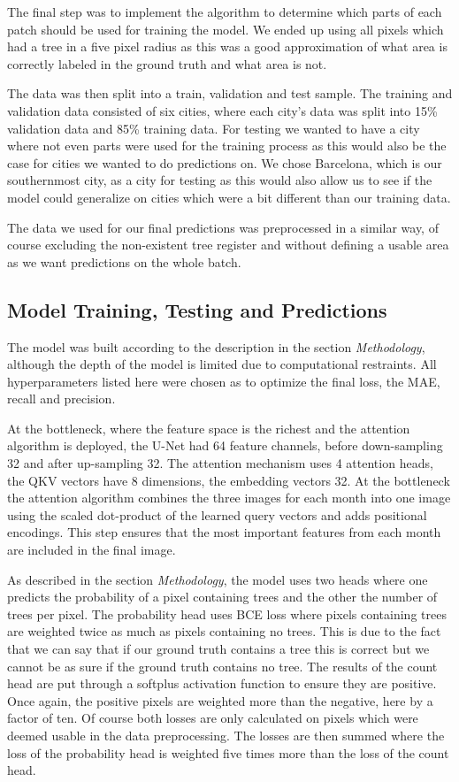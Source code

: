The final step was to implement the algorithm to determine which parts of each patch should be used for training the model. We ended up using all pixels which had a tree in a five pixel radius as this was a good approximation of what area is correctly labeled in the ground truth and what area is not. 

The data was then split into a train, validation and test sample. The training and validation data consisted of six cities, where each city's data was split into 15\% validation data and 85\% training data. For testing we wanted to have a city where not even parts were used for the training process as this would also be the case for cities we wanted to do predictions on. We chose Barcelona, which is our southernmost city, as a city for testing as this would also allow us to see if the model could generalize on cities which were a bit different than our training data. 

The data we used for our final predictions was preprocessed in a similar way, of course excluding the non-existent tree register and without defining a usable area as we want predictions on the whole batch. 

\subsection{Model Training, Testing and Predictions}
The model was built according to the description in the section \textit{Methodology}, although the depth of the model is limited due to computational restraints. All hyperparameters listed here were chosen as to optimize the final loss, the MAE, recall and precision.

At the bottleneck, where the feature space is the richest and the attention algorithm is deployed, the U-Net had 64 feature channels, before down-sampling 32 and after up-sampling 32. The attention mechanism uses 4 attention heads, the QKV vectors have 8 dimensions, the embedding vectors 32. At the bottleneck the attention algorithm combines the three images for each month into one image using the scaled dot-product of the learned query vectors and adds positional encodings. This step ensures that the most important features from each month are included in the final image. 

As described in the section \textit{Methodology}, the model uses two heads where one predicts the probability of a pixel containing trees and the other the number of trees per pixel. The probability head uses BCE loss where pixels containing trees are weighted twice as much as pixels containing no trees. This is due to the fact that we can say that if our ground truth contains a tree this is correct but we cannot be as sure if the ground truth contains no tree. The results of the count head are put through a softplus activation function to ensure they are positive. Once again, the positive pixels are weighted more than the negative, here by a factor of ten. Of course both losses are only calculated on pixels which were deemed usable in the data preprocessing. The losses are then summed where the loss of the probability head is weighted five times more than the loss of the count head. 

